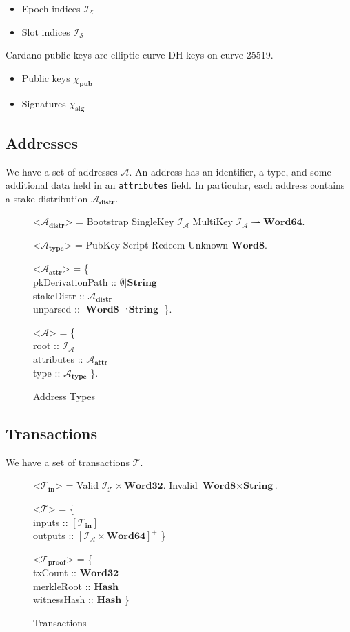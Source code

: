 \documentclass{article}
\def\fld{\\\llap{,\quad}}%
\newcommand{\rhu}{\rightharpoonup}
\newcommand{\lists}[1]{\left[{#1}\right]}
\newcommand{\nelists}[1]{\left[{#1}\right]^+}
\newcommand{\maybe}[1]{\emptyset | {#1}}
\newcommand{\idsof}[1]{\mathcal{I}\!_#1}
\newcommand{\txids}{\idsof{\txs}}
\newcommand{\agentids}{\idsof{\agents}}
\newcommand{\epochids}{\idsof{\mathcal{E}}}
\newcommand{\slotids}{\idsof{\mathcal{S}}}
\newcommand{\pubkey}{\chi_{\textbf{pub}}}
\newcommand{\signature}{\chi_{\textbf{sig}}}
\newcommand{\agents}{\mathcal{A}}
\newcommand{\txs}{\mathcal{T}}
\newcommand{\txins}{\txs_{\textbf{in}}}
\newcommand{\txpf}{\txs_{\textbf{proof}}}
\newcommand{\hstype}[1]{\textbf{#1}}
\newcommand{\String}{\hstype{String}}
\newcommand{\Word}[1]{\hstype{Word#1}}
\newcommand{\hash}{\hstype{Hash}}
\begin{document}
\begin{itemize}
\item Epoch indices $\epochids$
\item Slot indices $\slotids$
\end{itemize}

Cardano public keys are elliptic curve DH keys on curve 25519.

\begin{itemize}
\item Public keys $\pubkey$
\item Signatures $\signature$
\end{itemize}

\subsection{Addresses}

We have a set of addresses $\agents$. An address has an identifier, a type, and
some additional data held in an \verb|attributes| field. In particular, each
address contains a stake distribution $\agents_{\textbf{distr}}$.

\begin{figure}[H]
  \begin{grammar}
    <$\agents_{\textbf{distr}}$> = Bootstrap
      \alt SingleKey $\agentids$
      \alt MultiKey $\agentids \rhu \Word{64}$.

    <$\agents_{\textbf{type}}$> = PubKey \alt Script \alt Redeem \alt Unknown $\Word{8}$.

    <$\agents_{\textbf{attr}}$> = \{
    \fld pkDerivationPath :: $\maybe{\String}$
    \fld stakeDistr :: $\agents_{\textbf{distr}}$
    \fld unparsed :: $\Word{8}\rhu\String$
    \}.

    <$\agents$> = \{
    \fld root :: $\agentids$
    \fld attributes :: $\agents_{\textbf{attr}}$
    \fld type :: $\agents_{\textbf{type}}$
    \}.
  \end{grammar}

  \caption{Address Types}
\end{figure}

\subsection{Transactions}

We have a set of transactions $\txs$.

\begin{figure}[H]
  \caption{Transactions}
  \label{fig:txin}
  \begin{grammar}
    <$\txins$> = Valid $\txids\times\Word{32}$.
    \alt Invalid $\Word{8}\times\String$.

    <$\txs$> = \{
    \fld inputs :: $\lists{\txins}$
    \fld outputs :: $\nelists{\agentids \times \Word{64}}$
    \}

    <$\txpf$> = \{
    \fld txCount :: $\Word{32}$
    \fld merkleRoot :: $\hash$
    \fld witnessHash :: $\hash$
    \}
  \end{grammar}
\end{figure}
\end{document}
